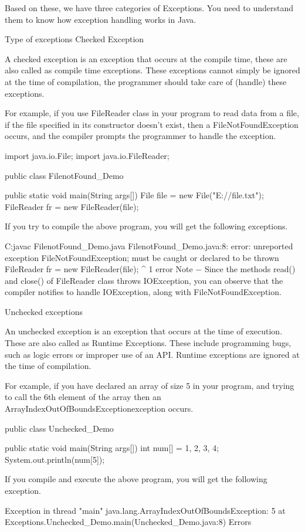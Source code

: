 Based on these, we have three categories of Exceptions. You need to understand them to know how exception handling works in Java.

Type of exceptions
Checked Exception

A checked exception is an exception that occurs at the compile time, these are also called as compile time exceptions. These exceptions cannot simply be ignored at the time of compilation, the programmer should take care of (handle) these exceptions.

For example, if you use FileReader class in your program to read data from a file, if the file specified in its constructor doesn't exist, then a FileNotFoundException occurs, and the compiler prompts the programmer to handle the exception.

import java.io.File;
import java.io.FileReader;

public class FilenotFound_Demo {

   public static void main(String args[]) {
      File file = new File("E://file.txt");
      FileReader fr = new FileReader(file);
   }
}
If you try to compile the above program, you will get the following exceptions.

C:\>javac FilenotFound_Demo.java
FilenotFound_Demo.java:8: error: unreported exception FileNotFoundException; must be caught or declared to be thrown
      FileReader fr = new FileReader(file);
                      ^
1 error
Note − Since the methods read() and close() of FileReader class throws IOException, you can observe that the compiler notifies to handle IOException, along with FileNotFoundException.

Unchecked exceptions

An unchecked exception is an exception that occurs at the time of execution. These are also called as Runtime Exceptions. These include programming bugs, such as logic errors or improper use of an API. Runtime exceptions are ignored at the time of compilation.

For example, if you have declared an array of size 5 in your program, and trying to call the 6th element of the array then an ArrayIndexOutOfBoundsExceptionexception occurs.

public class Unchecked_Demo {

   public static void main(String args[]) {
      int num[] = {1, 2, 3, 4};
      System.out.println(num[5]);
   }
}
If you compile and execute the above program, you will get the following exception.

Exception in thread "main" java.lang.ArrayIndexOutOfBoundsException: 5
    at Exceptions.Unchecked_Demo.main(Unchecked_Demo.java:8)
Errors

